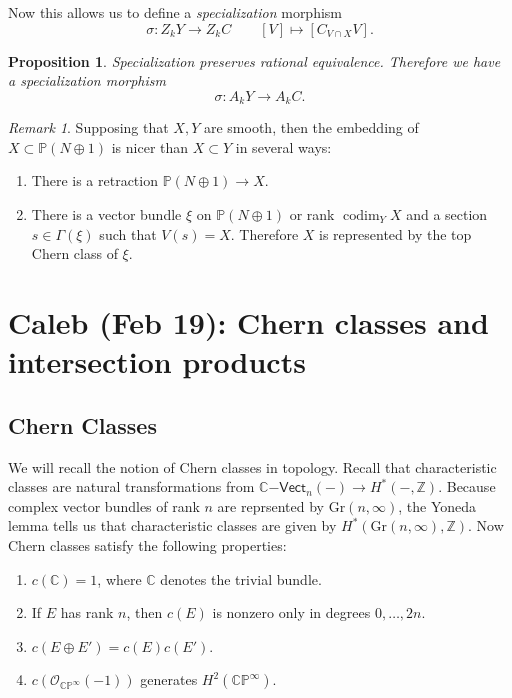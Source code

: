 \documentclass[leqno, openany]{memoir}
\newtheorem{prop}[thm]{Proposition}
\theoremstyle{definition}
\theoremstyle{remark}
\newtheorem{rmk}[thm]{Remark}
\theoremstyle{plain}
\theoremstyle{definition}
\theoremstyle{remark}
\newcommand{\C}{\mathbb{C}}
\newcommand{\Z}{\mathbb{Z}}
\renewcommand{\P}{\mathbb{P}}
\newcommand{\mc}[1]{\mathcal{#1}}
\newcommand{\mr}[1]{\mathrm{#1}}
\newcommand{\ms}[1]{\mathsf{#1}}
\begin{document}
Now this allows us to define a \textit{specialization} morphism
\[ \sigma \colon Z_k Y \to Z_k C \qquad [V] \mapsto [C_{V \cap X} V]. \]
\begin{prop}
    Specialization preserves rational equivalence. Therefore we have a specialization morphism
    \[ \sigma \colon A_k Y \to A_k C. \]
\end{prop}

\begin{rmk}
    Supposing that $X, Y$ are smooth, then the embedding of $X \subset \P(N \oplus 1)$ is nicer than $X \subset Y$ in several ways:
    \begin{enumerate}
        \item There is a retraction $\P(N \oplus 1) \to X$.
        \item There is a vector bundle $\xi$ on $\P(N \oplus 1)$ or rank $\operatorname{codim}_Y X$ and a section $s \in \Gamma(\xi)$ such that $V(s) = X$. Therefore $X$ is represented by the top Chern class of $\xi$.
    \end{enumerate}
\end{rmk}

\chapter{Caleb (Feb 19): Chern classes and intersection products}%
\label{cha:caleb_feb_19_chern_classes_and_intersection_products}

\section{Chern Classes}%
\label{sec:chern_classes-2}

We will recall the notion of Chern classes in topology. Recall that characteristic classes are natural transformations from $\C\ms{-Vect}_n(-) \to H^*(-, \Z)$. Because complex vector bundles of rank $n$ are reprsented by $\mr{Gr}(n, \infty)$, the Yoneda lemma tells us that characteristic classes are given by $H^*(\mr{Gr}(n, \infty), \Z)$. Now Chern classes satisfy the following properties:
\begin{enumerate}
    \item $c(\C) = 1$, where $\C$ denotes the trivial bundle.
    \item If $E$ has rank $n$, then $c(E)$ is nonzero only in degrees $0, \ldots, 2n$.
    \item $c(E \oplus E') = c(E) c(E')$.
    \item $c(\mc{O}_{\C\P^{\infty}}(-1))$ generates $H^2(\C\P^{\infty})$.
\end{enumerate}
\end{document}
